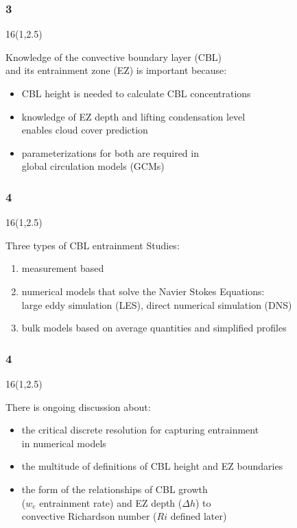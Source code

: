 \documentclass{beamer}
\newcommand\FrameText[1]{
\begin{textblock}{16}(1,2.5)
\raggedright #1
\end{textblock}}
\begin{document}
\begin{frame}
\frametitle{3}
\fontsize{12pt}{7.2}\selectfont
\FrameText{Knowledge of the convective boundary layer (CBL)\\
 and its entrainment zone (EZ) is important because:
 \vspace{10mm}
\begin{itemize}
\item CBL height is needed to calculate CBL concentrations
\vspace{10mm}
\item knowledge of EZ depth and lifting condensation level\\
 enables cloud cover prediction
\vspace{10mm}
\item parameterizations for both are required in\\ 
global circulation models (GCMs)
\end{itemize}
}
\end{frame}

\begin{frame}
\frametitle{4}
\fontsize{12pt}{7.2}\selectfont
\FrameText{Three types of CBL entrainment Studies:
\vspace{10mm}
\begin{enumerate}
\item measurement based
\vspace{10mm} 
\item numerical models that solve the Navier Stokes Equations:\\
large eddy simulation (LES), direct numerical simulation (DNS)
\vspace{10mm}
\item bulk models based on average quantities and simplified profiles
\end{enumerate}
}

\end{frame}
\begin{frame}
\frametitle{4}
\fontsize{12pt}{7.2}\selectfont
\FrameText{There is ongoing discussion about:
\vspace{10mm}
\begin{itemize}
\item the critical discrete resolution for capturing entrainment\\
in numerical models
\vspace{10mm}
\item the multitude of definitions of CBL height and EZ boundaries
\vspace{10mm}
\item the form of the relationships of CBL growth\\ 
($w_{e}$ entrainment rate) and EZ depth ($\Delta h$)  to \\
convective Richardson number ($Ri$ defined later)
\end{itemize}
}
\end{frame}
\end{document}
